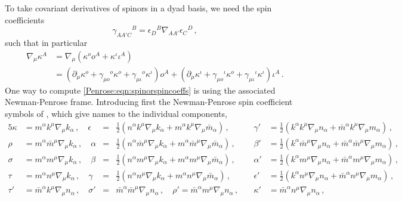 To take covariant derivatives of spinors in a dyad basis, we need the spin coefficients
\begin{equation}\label{Penrose:eqn:spinorspincoeffs}
\gamma_{AA' C}{}^{B} = \epsilon_{D}{}^B \nabla_{AA'}\epsilon_{C}{}^D \, ,
\end{equation}
such that in particular
\begin{equation}
\begin{aligned}
\nabla_{\mu}\kappa^A &= \nabla_{\mu}\left(\kappa^o o^A + \kappa^{\iota}\iota^A\right) \\
&= \left(\partial_{\mu}\kappa^o  + \gamma_{\mu o}{}^{o}\kappa^o + \gamma_{\mu \iota}{}^{o}\kappa^{\iota}\right) o^A + \left(\partial_{\mu} \kappa^{\iota}+ \gamma_{\mu o}{}^{\iota}\kappa^o + \gamma_{\mu \iota}{}^{\iota}\kappa^{\iota} \right) \iota^A \, .
\end{aligned}
\end{equation}
One way to compute \eqref{Penrose:eqn:spinorspincoeffs} is using the associated Newman-Penrose frame. Introducing first the Newman-Penrose spin coefficient symbols of \cite{Penrose:1985bww,Penrose:1986ca}, which give names to the individual components,
\begin{alignat}{5}
\kappa &= m^{\alpha} k^{\mu} \nabla_{\mu} k_{\alpha} \, , \quad \epsilon&=& \frac{1}{2}\left(n^{\alpha} k^{\mu} \nabla_{\mu} k_{\alpha} + m^{\alpha} k^{\mu} \nabla_{\mu} \bar{m}_{\alpha}\right) \, , \quad &\gamma'&= \frac{1}{2}\left(k^{\alpha} k^{\mu} \nabla_{\mu} n_{\alpha} + \bar{m}^{\alpha} k^{\mu} \nabla_{\mu} m_{\alpha}\right) \, , \nonumber \\
\rho &= m^{\alpha} \bar{m}^{\mu} \nabla_{\mu} k_{\alpha} \, , \quad \alpha &=& \frac{1}{2}\left(n^{\alpha} \bar{m}^{\mu} \nabla_{\mu} k_{\alpha} + m^{\alpha} \bar{m}^{\mu} \nabla_{\mu} \bar{m}_{\alpha}\right) \, , \quad &\beta'&  = \frac{1}{2}\left(k^{\alpha} \bar{m}^{\mu} \nabla_{\mu} n_{\alpha} + \bar{m}^{\alpha} \bar{m}^{\mu} \nabla_{\mu} m_{\alpha}\right) \, , \nonumber \\
\sigma &= m^{\alpha} m^{\mu} \nabla_{\mu} k_{\alpha} \, , \quad \beta &=& \frac{1}{2}\left(n^{\alpha} m^{\mu} \nabla_{\mu} k_{\alpha} + m^{\alpha} m^{\mu} \nabla_{\mu} \bar{m}_{\alpha}\right) \, , \quad &\alpha'&= \frac{1}{2}\left(k^{\alpha} m^{\mu} \nabla_{\mu} n_{\alpha} + \bar{m}^{\alpha} m^{\mu} \nabla_{\mu} m_{\alpha}\right) \, , \nonumber \\
\tau &= m^{\alpha} n^{\mu} \nabla_{\mu} k_{\alpha} \, , \quad \gamma&=& \frac{1}{2}\left(n^{\alpha} n^{\mu} \nabla_{\mu} k_{\alpha} + m^{\alpha} n^{\mu} \nabla_{\mu} \bar{m}_{\alpha}\right) \, , \quad &\epsilon'&= \frac{1}{2}\left(k^{\alpha} n^{\mu} \nabla_{\mu} n_{\alpha} + \bar{m}^{\alpha} n^{\mu} \nabla_{\mu} m_{\alpha}\right) \, , \nonumber \\
\tau' &= \bar{m}^{\alpha} k^{\mu} \nabla_{\mu} n_{\alpha} \, , \quad \sigma' &=& \bar{m}^{\alpha} \bar{m}^{\mu} \nabla_{\mu} n_{\alpha} \, , \quad \rho'  = \bar{m}^{\alpha} m^{\mu} \nabla_{\mu} n_{\alpha} \, , \quad &\kappa'&  =\bar{m}^{\alpha} n^{\mu} \nabla_{\mu} n_{\alpha} \, ,  \label{Penrose:eqn:spincoeffssymbols}
\end{alignat}
